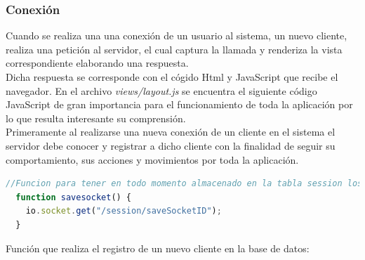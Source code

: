 \subsubsection{ Conexión }
\label{sec:conexion}


Cuando se realiza una una conexión de un usuario al sistema, un nuevo cliente, realiza una petición al servidor, el cual captura la llamada y renderiza la vista correspondiente elaborando una respuesta.\\

Dicha respuesta se corresponde con el cógido Html y JavaScript que recibe el navegador. En el archivo \emph{views/layout.js} se encuentra el siguiente código JavaScript de gran importancia
para el funcionamiento de toda la aplicación por lo que resulta interesante su comprensión.\\

Primeramente al realizarse una nueva conexión de un cliente en el sistema el servidor debe conocer y registrar a dicho cliente con la finalidad de seguir su comportamiento, sus acciones y 
movimientos por toda la aplicación.\\

\begin{lstlisting}[language=JavaScript]
  //Funcion para tener en todo momento almacenado en la tabla session los sockets conectados junto con el usuario al que pertenece
  function savesocket() {
    io.socket.get("/session/saveSocketID");
  }  
\end{lstlisting}


Función que realiza el registro de un nuevo cliente en la base de datos:\\

